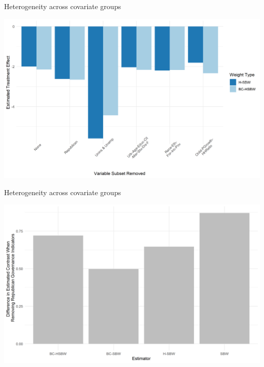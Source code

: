 \documentclass[hyperref={pdfpagelabels=false}]{beamer}
\begin{document}
\begin{frame}{Heterogeneity across covariate groups}
\begin{center}
	\includegraphics[scale=0.5]{01_Plots/loo-covariates-main-c1.png}
\end{center}
\end{frame}

\begin{frame}{Heterogeneity across covariate groups}
\begin{center}
	\includegraphics[scale=0.5]{01_Plots/repub-diff-c1.png}
\end{center}
\end{frame}
\end{document}
